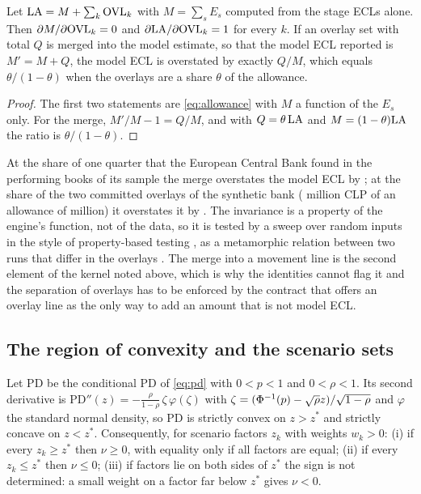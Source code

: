 \begin{proposition}
\label{prop:overlay}
Let $\mathrm{LA}=M+\sum_k\mathrm{OVL}_k$ with $M=\sum_sE_s$ computed from the stage ECLs alone. Then $\partial M/\partial\mathrm{OVL}_k=0$ and $\partial\mathrm{LA}/\partial\mathrm{OVL}_k=1$ for every $k$. If an overlay set with total $Q$ is merged into the model estimate, so that the model ECL reported is $M'=M+Q$, the model ECL is overstated by exactly $Q/M$, which equals $\theta/(1-\theta)$ when the overlays are a share $\theta$ of the allowance.
\end{proposition}

\begin{proof}
The first two statements are \eqref{eq:allowance} with $M$ a function of the $E_s$ only. For the merge, $M'/M - 1=Q/M$, and with $Q=\theta\,\mathrm{LA}$ and $M=(1-\theta)\mathrm{LA}$ the ratio is $\theta/(1-\theta)$.
\end{proof}

At the share of one quarter that the European Central Bank found in the performing books of its sample \citep{ecb2024} the merge overstates the model ECL by \ethreeMergeAtQuarter{}; at the \ethreeSevenShare{} share of the two committed overlays of the synthetic bank (\ethreeSevenOverlay{} million CLP of an allowance of \ethreeSevenAllowance{} million) it overstates it by \ethreeSevenMerge{}.
The invariance is a property of the engine's function, not of the data, so it is tested by a sweep over random inputs in the style of property-based testing \citep{claessen2000}, as a metamorphic relation between two runs that differ in the overlays \citep{chen2018}.
The merge into a movement line is the second element of the kernel noted above, which is why the identities cannot flag it and the separation of overlays has to be enforced by the contract that offers an overlay line as the only way to add an amount that is not model ECL.

\subsection{The region of convexity and the scenario sets}
\label{sec:theory-convexity}

\begin{proposition}
\label{prop:convexity}
Let $\mathrm{PD}$ be the conditional PD of \eqref{eq:pd} with $0<p<1$ and $0<\rho<1$. Its second derivative is $\mathrm{PD}''(z)=-\frac{\rho}{1-\rho}\,\zeta\,\varphi(\zeta)$ with $\zeta=(\Phi^{-1}(p)-\sqrt\rho z)/\sqrt{1-\rho}$ and $\varphi$ the standard normal density, so $\mathrm{PD}$ is strictly convex on $z>z^{*}$ and strictly concave on $z<z^{*}$. Consequently, for scenario factors $z_k$ with weights $w_k>0$: (i) if every $z_k\ge z^{*}$ then $\nu\ge0$, with equality only if all factors are equal; (ii) if every $z_k\le z^{*}$ then $\nu\le0$; (iii) if factors lie on both sides of $z^{*}$ the sign is not determined: a small weight on a factor far below $z^{*}$ gives $\nu<0$.
\end{proposition}

